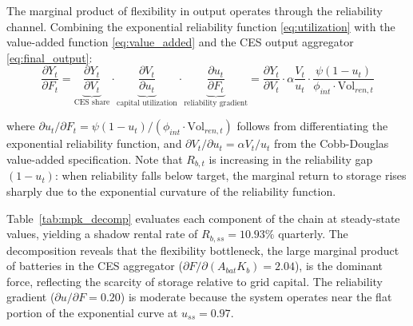 \documentclass[12pt, a4paper]{article}
\begin{document}
	The marginal product of flexibility in output operates through the reliability channel. Combining the exponential reliability function \eqref{eq:utilization} with the value-added function \eqref{eq:value_added} and the CES output aggregator \eqref{eq:final_output}:
	\begin{equation}
		\frac{\partial Y_t}{\partial F_t} = \underbrace{\frac{\partial Y_t}{\partial V_t}}_{\text{CES share}} \cdot \underbrace{\frac{\partial V_t}{\partial u_t}}_{\text{capital utilization}} \cdot \underbrace{\frac{\partial u_t}{\partial F_t}}_{\text{reliability gradient}} = \frac{\partial Y_t}{\partial V_t} \cdot \alpha \frac{V_t}{u_t} \cdot \frac{\psi (1 - u_t)}{\phi_{int} \cdot \text{Vol}_{ren,t}}
		\label{eq:dY_dF}
	\end{equation}
	
	where $\partial u_t / \partial F_t = \psi(1-u_t)/(\phi_{int} \cdot \text{Vol}_{ren,t})$ follows from differentiating the exponential reliability function, and $\partial V_t / \partial u_t = \alpha V_t / u_t$ from the Cobb-Douglas value-added specification. Note that $R_{b,t}$ is increasing in the reliability gap $(1-u_t)$: when reliability falls below target, the marginal return to storage rises sharply due to the exponential curvature of the reliability function.
	
	Table~\ref{tab:mpk_decomp} evaluates each component of the chain at steady-state values, yielding a shadow rental rate of $R_{b,ss} = 10.93\%$ quarterly. The decomposition reveals that the flexibility bottleneck, the large marginal product of batteries in the CES aggregator ($\partial F / \partial(A_{bat} K_b) = 2.04$), is the dominant force, reflecting the scarcity of storage relative to grid capital. The reliability gradient ($\partial u / \partial F = 0.20$) is moderate because the system operates near the flat portion of the exponential curve at $u_{ss} = 0.97$.
	
\end{document}
